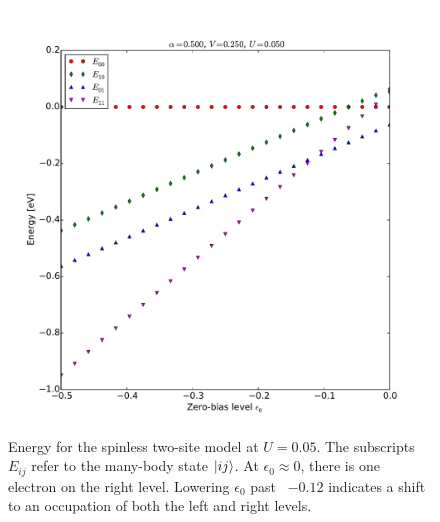 \begin{figure}[h]
    \centering
    \includegraphics[height=.45\textheight]{pdf/energy/perrin_distribution_u1.pdf}
    \caption{Energy for the spinless two-site model at $U=0.05$. The subscripts $E_{ij}$ refer to the many-body state $\ket{i j}$. At $\epsilon_0 \approx 0$, there is one electron on the right level. Lowering $\epsilon_0$ past ~$-0.12$ indicates a shift to an occupation of both the left and right levels.  }
    \label{fig:perrinenergy1}
\end{figure}
